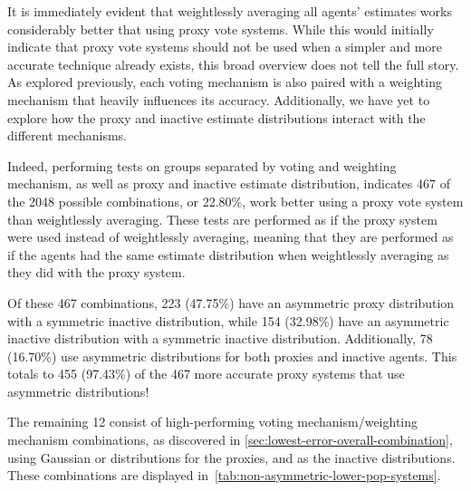 It is immediately evident that weightlessly averaging all agents' estimates works
considerably better that using proxy vote systems.
While this would initially indicate that proxy vote systems should not be used when a
simpler and more accurate technique already exists, this broad overview does not tell
the full story.
As explored previously, each voting mechanism is also paired with a weighting
mechanism that heavily influences its accuracy.
Additionally, we have yet to explore how the proxy and inactive estimate
distributions interact with the different mechanisms.

Indeed, performing tests on groups separated by voting and weighting mechanism, as
well as proxy and inactive estimate distribution, indicates 467 of the 2048 possible
combinations, or 22.80\%, work better using a proxy vote system than weightlessly
averaging.
These tests are performed as if the proxy system were used instead of weightlessly
averaging, meaning that they are performed as if the agents had the same estimate
distribution when weightlessly averaging as they did with the proxy system.

Of these 467 combinations, 223 (47.75\%) have an asymmetric proxy distribution with
a symmetric inactive distribution, while 154 (32.98\%) have an asymmetric inactive
distribution with a symmetric inactive distribution.
Additionally, 78 (16.70\%) use asymmetric distributions for both proxies and
inactive agents.
This totals to 455 (97.43\%) of the 467 more accurate proxy systems that use
asymmetric distributions!

The remaining 12 consist of high-performing voting mechanism/weighting mechanism
combinations, as discovered in \autoref{sec:lowest-error-overall-combination},
using Gaussian or  distributions for the proxies,
and  as the inactive distributions.
These combinations are displayed in~\autoref{tab:non-asymmetric-lower-pop-systems}.

